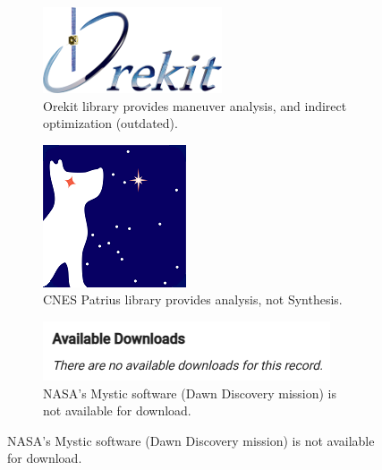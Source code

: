 \documentclass{beamer}
\begin{document}
\begin{frame}
    \begin{figure}[htbp]
        \centering
        \begin{subfigure}{0.25\textwidth}
            \includegraphics[width=\textwidth]{img/orekit-logo.png}
            \caption{Orekit library provides maneuver analysis, and indirect optimization (outdated).}
        \end{subfigure}
        \begin{subfigure}{0.25\textwidth}
            \includegraphics[width=\textwidth]{img/patrius_logo.png}
            \caption{CNES Patrius library provides analysis, not Synthesis.}
        \end{subfigure}
        \begin{subfigure}{0.25\textwidth}
            \centering
            \includegraphics[width=\textwidth]{img/mystic_no_download.png}
            \caption{NASA's Mystic software (Dawn Discovery mission) is not available for download.}
        \end{subfigure}
    \end{figure}


\end{frame}
\end{document}
